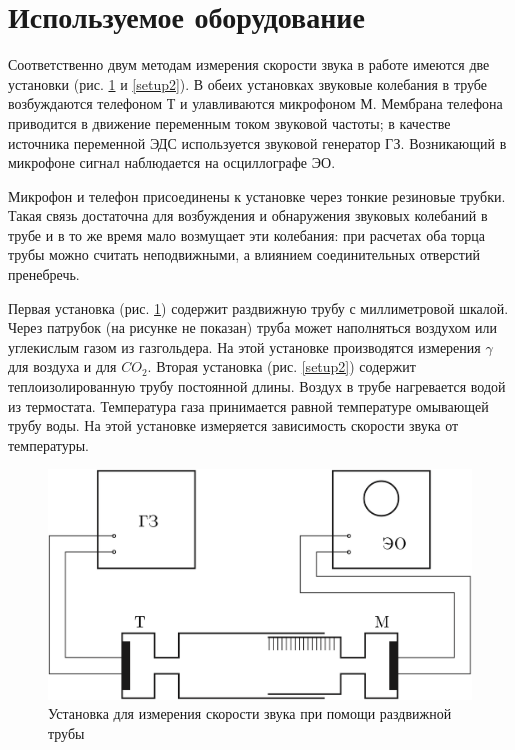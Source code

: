 \documentclass[a4paper,12pt]{article} %
\begin{document}
\section{Используемое оборудование}

Соответственно двум методам измерения скорости звука в работе имеются две установки (рис. \ref{setup1} и \ref{setup2}). В обеих установках звуковые колебания в трубе возбуждаются телефоном Т и улавливаются микрофоном М. Мембрана телефона приводится в движение переменным током звуковой частоты; в качестве источника переменной ЭДС используется звуковой генератор ГЗ. Возникающий в микрофоне сигнал наблюдается на осциллографе ЭО.

Микрофон и телефон присоединены к установке через тонкие резиновые трубки. Такая связь достаточна для возбуждения и обнаружения звуковых колебаний в трубе и в то же время мало возмущает эти колебания: при расчетах оба торца трубы можно считать неподвижными, а влиянием соединительных отверстий пренебречь.

Первая установка (рис. \ref{setup1}) содержит раздвижную трубу с миллиметровой шкалой. Через патрубок (на рисунке не показан) труба может наполняться воздухом или углекислым газом из газгольдера. На этой установке производятся измерения $ \gamma $ для воздуха и для $ CO_2 $. Вторая установка (рис. \ref{setup2}) содержит теплоизолированную трубу постоянной длины. Воздух в трубе нагревается водой из термостата. Температура газа принимается равной температуре омывающей трубу воды. На этой установке измеряется зависимость скорости звука от температуры.

\begin{figure}[h!]
    \centering
    \includegraphics[width=\textwidth]{установка1.png}
    \caption{Установка для измерения скорости звука при помощи раздвижной трубы}\label{setup}
	\label{setup1}
\end{figure}
\end{document}
